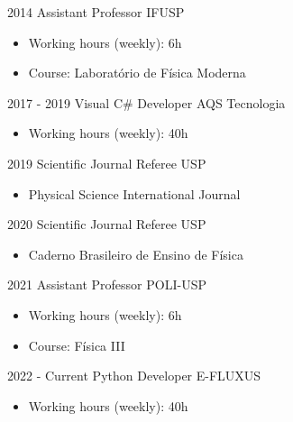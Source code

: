 \documentclass[9pt]{developercv} %
\begin{document}
\vspace{-10 pt}
\begin{entrylist}
	\entry
        {2014}
		{Assistant Professor}
		{IFUSP}
		{\vspace{-10pt}
        \begin{itemize}[noitemsep,topsep=0pt,parsep=0pt,partopsep=0pt, leftmargin=-1pt]
            \item Working hours (weekly): 6h
            \item Course: Laboratório de Física Moderna
        \end{itemize}
		}
	\entry
        {2017 - 2019}
		{Visual C\# Developer}
		{AQS Tecnologia}
		{\vspace{-10pt}
        \begin{itemize}[noitemsep,topsep=0pt,parsep=0pt,partopsep=0pt, leftmargin=-1pt]
            \item Working hours (weekly): 40h
        \end{itemize}
		}
	\entry
        {2019}
		{Scientific Journal Referee}
		{USP}
		{\vspace{-10pt}
        \begin{itemize}[noitemsep,topsep=0pt,parsep=0pt,partopsep=0pt, leftmargin=-1pt]
            \item Physical Science International Journal
        \end{itemize}
		}
	\entry
        {2020}
		{Scientific Journal Referee}
		{USP}
		{\vspace{-10pt}
        \begin{itemize}[noitemsep,topsep=0pt,parsep=0pt,partopsep=0pt, leftmargin=-1pt]
            \item Caderno Brasileiro de Ensino de Física
        \end{itemize}
		}
	\entry
        {2021}
		{Assistant Professor}
		{POLI-USP}
		{\vspace{-10pt}
        \begin{itemize}[noitemsep,topsep=0pt,parsep=0pt,partopsep=0pt, leftmargin=-1pt]
            \item Working hours (weekly): 6h
            \item Course: Física III
        \end{itemize}
		}
	\entry
        {2022 - Current}
		{Python Developer}
		{E-FLUXUS}
		{\vspace{-10pt}
        \begin{itemize}[noitemsep,topsep=0pt,parsep=0pt,partopsep=0pt, leftmargin=-1pt]
            \item Working hours (weekly): 40h
        \end{itemize}
		}
\end{entrylist}
\end{document}
